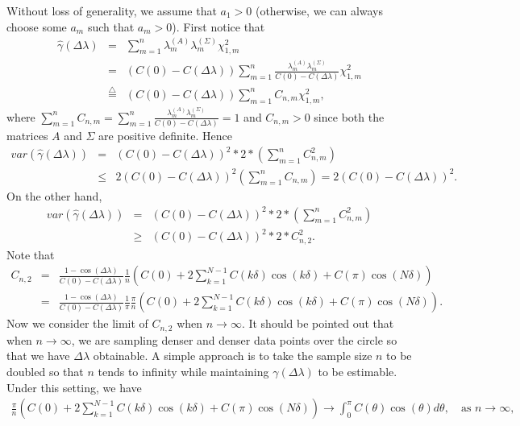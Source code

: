Without loss of generality, we assume that $a_1 > 0$ (otherwise, we can always choose some $a_m$ such that $a_m > 0$). First notice that
\begin{eqnarray*}
\hat{\gamma}(\Delta \lambda) &=& \sum_{m = 1}^n \lambda_m^{(A)} \lambda_m^{(\Sigma)} \chi_{1,m}^2  \\
&=& (C(0) - C(\Delta \lambda)) \sum_{m = 1}^n \frac{\lambda_m^{(A)} \lambda_m^{(\Sigma)}}{C(0) - C(\Delta \lambda)} \chi_{1,m}^2  \\
&\overset{\bigtriangleup}{=}&  (C(0) - C(\Delta \lambda)) \sum_{m = 1}^n C_{n,m} \chi_{1,m}^2,
\end{eqnarray*}
where $\sum_{m=1}^n C_{n, m} = \sum_{m=1}^n \frac{\lambda_m^{(A)} \lambda_m^{(\Sigma)}}{C(0) - C(\Delta \lambda)} = 1$ and $C_{n, m} > 0$ since both the matrices $A$ and $\Sigma$ are positive definite. Hence
\begin{eqnarray*}
var(\hat{\gamma}(\Delta \lambda)) &=& (C(0) - C(\Delta \lambda))^2 * 2 * \left(\sum_{m = 1}^n C_{n,m}^2\right) \\
&\le& 2(C(0) - C(\Delta \lambda))^2\left(\sum_{m = 1}^n C_{n,m}\right) = 2(C(0) - C(\Delta \lambda))^2.
\end{eqnarray*}
On the other hand,
\begin{eqnarray*}
var(\hat{\gamma}(\Delta \lambda)) &=& (C(0) - C(\Delta \lambda))^2 * 2 * \left(\sum_{m = 1}^n C_{n,m}^2\right) \\
&\ge& (C(0) - C(\Delta \lambda))^2 * 2 * C_{n, 2}^2.
\end{eqnarray*}
Note that
\begin{eqnarray*}
C_{n, 2} &=& \frac{1 - \cos(\Delta \lambda)}{C(0) - C(\Delta \lambda)} \frac{1}{n}\left(C(0) + 2\sum_{k = 1}^{N-1}C(k\delta)\cos(k\delta) + C(\pi)\cos(N\delta)\right) \\
&=& \frac{1 - \cos(\Delta \lambda)}{C(0) - C(\Delta \lambda)} \frac{1}{\pi} \frac{\pi}{n}\left(C(0) + 2\sum_{k = 1}^{N-1}C(k\delta)\cos(k\delta) + C(\pi)\cos(N\delta)\right).
\end{eqnarray*}
Now we consider the limit of $C_{n, 2}$ when $n \to \infty$. It should be pointed out that when $n \to \infty$, we are sampling denser and denser data points over the circle so that we have $\Delta\lambda$ obtainable. A simple approach is to take the sample size $n$ to be doubled so that $n$ tends to infinity while maintaining $\gamma(\Delta \lambda)$ to be estimable. Under this setting, we have
\begin{eqnarray*}
\frac{\pi}{n}\left(C(0) + 2\sum_{k = 1}^{N-1}C(k\delta)\cos(k\delta) + C(\pi)\cos(N\delta)\right) \to \int_0^\pi C(\theta)\cos(\theta)d\theta, \quad \mbox{as $n \to \infty$},
\end{eqnarray*}
